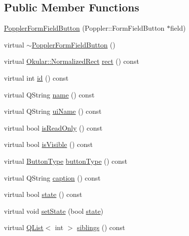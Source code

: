 \subsection*{Public Member Functions}
\begin{DoxyCompactItemize}
\item 
\hyperlink{classPopplerFormFieldButton_a6a4fc19b5556da37f80ce45627c14a02}{Poppler\+Form\+Field\+Button} (Poppler\+::\+Form\+Field\+Button $\ast$field)
\item 
virtual \hyperlink{classPopplerFormFieldButton_a781c4d98e734130c816b0587af92d919}{$\sim$\+Poppler\+Form\+Field\+Button} ()
\item 
virtual \hyperlink{classOkular_1_1NormalizedRect}{Okular\+::\+Normalized\+Rect} \hyperlink{classPopplerFormFieldButton_a5231bf41abeeb08bafe8e117abcbed2d}{rect} () const 
\item 
virtual int \hyperlink{classPopplerFormFieldButton_a4bb5f676195a1e62368db43439a13288}{id} () const 
\item 
virtual Q\+String \hyperlink{classPopplerFormFieldButton_ac00d336c131761fdd0f88252ec58e20d}{name} () const 
\item 
virtual Q\+String \hyperlink{classPopplerFormFieldButton_a4ee3c08869be9c136d4670b26c480be0}{ui\+Name} () const 
\item 
virtual bool \hyperlink{classPopplerFormFieldButton_a7644837298cd51f3fe935733f2f4a461}{is\+Read\+Only} () const 
\item 
virtual bool \hyperlink{classPopplerFormFieldButton_a5dda8c1f6ec320482523889ad0e0ea53}{is\+Visible} () const 
\item 
virtual \hyperlink{classOkular_1_1FormFieldButton_a4b03fd77132be17273c8f4ebbd247186}{Button\+Type} \hyperlink{classPopplerFormFieldButton_a1056d9f0158df177ae4cafe9624bac2a}{button\+Type} () const 
\item 
virtual Q\+String \hyperlink{classPopplerFormFieldButton_ac6011b47e8665ac5622f810b81ddc3f5}{caption} () const 
\item 
virtual bool \hyperlink{classPopplerFormFieldButton_a856b904e5940f3046d11bd58d4e7518a}{state} () const 
\item 
virtual void \hyperlink{classPopplerFormFieldButton_ae1a75f015cd9ddd989d2d43459da6ea0}{set\+State} (bool \hyperlink{classPopplerFormFieldButton_a856b904e5940f3046d11bd58d4e7518a}{state})
\item 
virtual \hyperlink{classQList}{Q\+List}$<$ int $>$ \hyperlink{classPopplerFormFieldButton_a118cafc410cf031c298d313a618fb699}{siblings} () const 
\end{DoxyCompactItemize}
